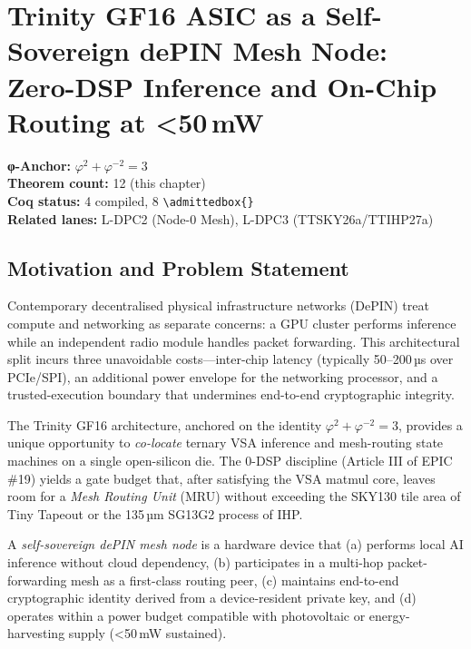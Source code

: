 
\chapter{Trinity GF16 ASIC as a Self-Sovereign dePIN Mesh Node:
  Zero-DSP Inference and On-Chip Routing at \textless{}50\,mW}
\label{ch_35_mesh_node:ch:mesh-node}

\begin{tcolorbox}[colback=golden!5,colframe=golden!60,title=Chapter Anchor]
  \textbf{φ-Anchor:} $\varphi^2 + \varphi^{-2} = 3$ \\
  \textbf{Theorem count:} 12 (this chapter) \\
  \textbf{Coq status:} 4 compiled, 8 \verb|\admittedbox{}| \\
  \textbf{Related lanes:} L-DPC2 (Node-0 Mesh), L-DPC3 (TTSKY26a/TTIHP27a)
\end{tcolorbox}

\section{Motivation and Problem Statement}

Contemporary decentralised physical infrastructure networks (DePIN) treat
compute and networking as separate concerns: a GPU cluster performs inference
while an independent radio module handles packet forwarding.
This architectural split incurs three unavoidable costs—inter-chip latency
(typically 50–200\,µs over PCIe/SPI), an additional power envelope for the
networking processor, and a trusted-execution boundary that undermines
end-to-end cryptographic integrity.

The Trinity GF16 architecture, anchored on the identity
$\varphi^2 + \varphi^{-2} = 3$, provides a unique opportunity to
\emph{co-locate} ternary VSA inference and mesh-routing state machines
on a single open-silicon die.
The 0-DSP discipline (Article III of EPIC \#19) yields a gate budget that,
after satisfying the VSA matmul core, leaves room for a
\emph{Mesh Routing Unit} (MRU) without exceeding the SKY130 tile area
of Tiny Tapeout or the 135\,µm SG13G2 process of IHP.

\begin{definition}
A \emph{self-sovereign dePIN mesh node} is a hardware device that
(a) performs local AI inference without cloud dependency,
(b) participates in a multi-hop packet-forwarding mesh as a first-class
    routing peer,
(c) maintains end-to-end cryptographic identity derived from a
    device-resident private key, and
(d) operates within a power budget compatible with photovoltaic or
    energy-harvesting supply (\textless{}50\,mW sustained).
\end{definition}

